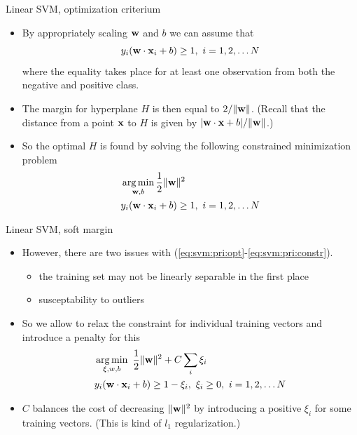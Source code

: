 \documentclass[handout]{beamer}   %
\def\argmin{\mathop{\rm arg\,min}\limits}
\def\b#1{{\bf #1}}
\begin{document}
\begin{frame}{Linear SVM, optimization criterium}
  \begin{itemize}
  \item By appropriately scaling $\b w$ and $b$ we can assume that
    \begin{equation*} %
      y_i(\b w \cdot \b x_i + b) \ge 1, \ i=1,2,\ldots N
    \end{equation*}
    where the equality takes place
    for at least one observation from both the negative and positive class.

    \pause
  \item The margin for hyperplane $H$ is then equal to ${2/ \|\b w\|}$.
    (Recall that the distance from a point $\b x$ to $H$ is given by
    $ {|\b w \cdot \b x + b| / \|\b w\|} $.)

    \pause
  \item So the optimal $H$ is found by solving the following constrained
    minimization problem
    \begin{align}
      \label{eq:svm:pri:opt}
      {}& \argmin_{\b w,b}{1\over 2} \|\b w\|^2 \\
      \label{eq:svm:pri:constr}
      {}& y_i(\b w \cdot \b x_i + b) \ge 1, \ i=1,2,\ldots N
    \end{align}
  \end{itemize}
\end{frame}
\def\svmprimary{(\ref{eq:svm:pri:opt}-\ref{eq:svm:pri:constr})}


\begin{frame}{Linear SVM, soft margin}
  \begin{itemize}[<+->]
  \item However, there are two issues with \svmprimary.
    \begin{itemize}
    \item the training set may not be linearly separable in the first place
    \item susceptability to outliers
    \end{itemize}
  \item So we allow to relax the constraint for individual training vectors and
    introduce a penalty for this
    \begin{align}
      \label{eq:soft:pri:opt}
      {}& \argmin_{\b \xi,w,b}\ {1\over 2} \|\b w\|^2 + C\sum_i \xi_i \\
      \label{eq:soft:pri:constr}
      {}& y_i(\b w \cdot \b x_i + b) \ge 1 - \xi_i, \ \xi_i\ge0, \ i=1,2,\ldots N
    \end{align}
  \item $C$ balances the cost of decreasing $\|\b w\|^2$ by introducing a positive $\xi_i$
    for some training vectors. (This is kind of $l_1$ regularization.)
  \end{itemize}
\end{frame}
\def\softprimary{(\ref{eq:svm:pri:opt}-\ref{eq:svm:pri:constr})}
\end{document}
